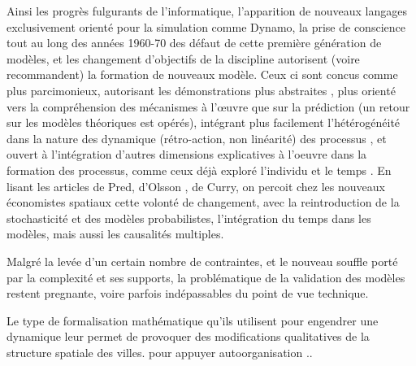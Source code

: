 Ainsi les progrès fulgurants de l'informatique, l'apparition de nouveaux langages exclusivement orienté pour la simulation comme Dynamo, la prise de conscience tout au long des années 1960-70 des défaut de cette première génération de modèles, et les changement d'objectifs de la discipline \autocite[12]{Batty1994} \autocite{Boyce1988} autorisent (voire recommandent) la formation de nouveaux modèle. Ceux ci sont concus comme plus parcimonieux, autorisant les démonstrations plus abstraites \autocite{Forrester1969}, plus orienté vers la compréhension des mécanismes à l’œuvre que sur la prédiction (un retour sur les modèles théoriques est opérés), intégrant plus facilement l'hétérogénéité dans la nature des dynamique (rétro-action, non linéarité) des processus \autocite{Forrester1969, Wilson1970, Allen1978}, et ouvert à l'intégration d'autres dimensions explicatives à l'oeuvre dans la formation des processus, comme ceux déjà exploré l'individu et le temps \autocite{Hagerstrand1967a,Orcutt1957,Forrester1961}. En lisant les articles de Pred, d'Olsson \autocite{Olsson1969,Olsson1970}, de Curry, on percoit chez les nouveaux économistes spatiaux cette volonté de changement, avec la reintroduction de la stochasticité et des modèles probabilistes, l'intégration du temps dans les modèles, mais aussi les causalités multiples.



Malgré la levée d'un certain nombre de contraintes, et le nouveau souffle porté par la complexité et ses supports, la problématique de la validation des modèles restent pregnante, voire parfois indépassables du point de vue technique.  \autocite[296]{Batty1976} 

Le type de formalisation mathématique qu'ils utilisent pour engendrer une dynamique leur permet de provoquer des modifications qualitatives de la structure spatiale des villes. \autocite{pumain1984} pour appuyer autoorganisation ..

